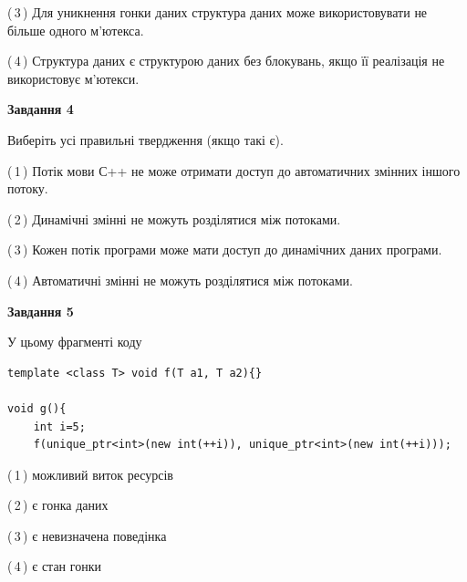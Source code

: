 \documentclass[12pt, ukrainian]{article}
\begin{document}
\begin {large}
{(\,3\,) Для уникнення гонки даних структура даних може використовувати не більше одного м’ютекса.%

(\,4\,) Структура даних є структурою даних без блокувань, якщо її реалізація не використовує м’ютекси.%



\begin{center}
\textbf{Завдання 4}
\end{center}
Виберіть усі правильні твердження (якщо такі є).\par
\vspace{2mm}

(\,1\,) Потік мови С++ не може отримати доступ до автоматичних змінних іншого потоку.%

(\,2\,) Динамічні змінні не можуть розділятися між потоками.%

(\,3\,) Кожен потік програми може мати доступ до динамічних даних програми.%

(\,4\,) Автоматичні змінні не можуть розділятися між потоками.%



\begin{center}
\textbf{Завдання 5}
\end{center}
У цьому фрагменті коду
\begin{verbatim}
template <class T> void f(T a1, T a2){}

void g(){
    int i=5;
    f(unique_ptr<int>(new int(++i)), unique_ptr<int>(new int(++i)));
\end{verbatim}

(\,1\,) можливий виток ресурсів%

(\,2\,) є гонка даних%

(\,3\,) є невизначена поведінка%

(\,4\,) є стан гонки%


}
\end {large}
\end{document}
